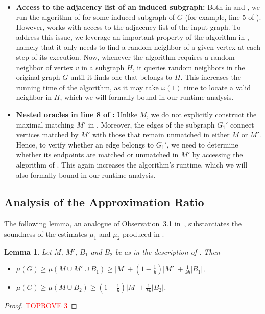 \documentclass[letterpaper,11pt]{article}
\newtheorem{lemma}{Lemma}[section]
\begin{document}
\begin{itemize}
    \item \textbf{Access to the adjacency list of an induced subgraph:} Both in  and , we run the algorithm of  for some induced subgraph of $G$ (for example, line 5 of ). However,  works with access to the adjacency list of the input graph. To address this issue, we leverage an important property of the algorithm in , namely that it only needs to find a random neighbor of a given vertex at each step of its execution. Now, whenever the algorithm requires a random neighbor of vertex $v$ in a subgraph $H$, it queries random neighbors in the original graph $G$ until it finds one that belongs to $H$. This increases the running time of the algorithm, as it may take $\omega(1)$ time to locate a valid neighbor in $H$, which we will formally bound in our runtime analysis.

    \item \textbf{Nested oracles in line 8 of :} Unlike $M$, we do not explicitly construct the maximal matching $M'$ in . Moreover, the edges of the subgraph $G_1'$ connect vertices matched by $M'$ with those that remain unmatched in either $M$ or $M'$. Hence, to verify whether an edge belongs to $G_1'$, we need to determine whether its endpoints are matched or unmatched in $M'$ by accessing the algorithm of . This again increases the algorithm's runtime, which we will also formally bound in our runtime analysis.
\end{itemize}










\subsection{Analysis of the Approximation Ratio}

The following lemma,
an analogue of Observation~3.1 in~\cite{BhattacharyaKSW23},
substantiates the soundness of the estimates $\mu_1$ and $\mu_2$ produced in .

\begin{lemma} \label{lem:fractional_matching}
    Let $M$, $M'$, $B_1$ and $B_2$ be as in the description of . Then
    \begin{itemize}
        \item $\mu(G) \ge \mu(M \cup M' \cup B_1) \ge |M| + (1 - \frac{1}{b}) |M'| + \frac{1}{kb} |B_1|$,
        \item $\mu(G) \ge \mu(M \cup B_2) \ge (1 - \frac{1}{b}) |M| + \frac{1}{kb} |B_2|$.
    \end{itemize}
\end{lemma}
\begin{proof}\textcolor{red}{TOPROVE 3}\end{proof}
\end{document}
